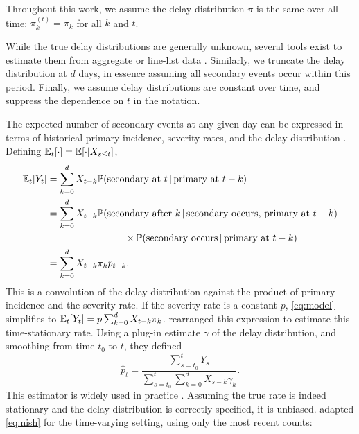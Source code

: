 \documentclass{article}
\renewcommand{\hat}{\widehat} %
\newcommand{\given}{\, \vert \,}
\begin{document}
\noindent Throughout this work, we assume the delay distribution $\pi$ is the same over all time: $\pi_k^{(t)} =
\pi_k$ for all $k$ and $t$.

While the true delay distributions are generally unknown, several
tools exist to estimate them 
from aggregate or line-list data \citep{delay_distrs}. 
Similarly,
we truncate the delay distribution at $d$ days, in essence assuming all
secondary events occur within this period. Finally, we assume delay
distributions are constant over time, and suppress the dependence on $t$ in the notation.

The expected number of secondary events at any given day can be expressed in
terms of historical primary incidence, severity rates, and the delay
distribution \citep{fusedlasso,nishiura}. Defining $\mathbb{E}_t[\cdot] = \mathbb{E}[\cdot\vert X_{s\leq t}]$,
%
\begin{align}\label{eq:model}
    \E_t[Y_t] &= \sum_{k=0}^d X_{t-k} \mathbb{P}(\text{secondary at $t$}\given\text{primary at }t-k) \nonumber \\ %
            &= \sum_{k=0}^d X_{t-k} \mathbb{P}(\text{secondary after $k$}\given\text{secondary occurs, primary at }t-k) \nonumber \\
    &\qquad\qquad\qquad\qquad\times\mathbb{P}(\text{secondary occurs}\given\text{primary at $t-k$}) \nonumber \\
    &= \sum_{k=0}^d X_{t-k} \pi_k p_{t-k}.%
\end{align}
%
This is a convolution of the delay distribution against the product of
primary incidence and the severity rate. If the severity rate is a constant
$p$, \eqref{eq:model} simplifies to $\mathbb{E}_t[Y_t] = p\sum_{k=0}^d X_{t-k}\pi_k$.
\citet{nishiura} rearranged this expression to estimate this time-stationary rate.
Using a plug-in estimate $\gamma$ of the delay distribution, and smoothing from time $t_0$ to $t$, they defined
%
\begin{equation}\label{eq:nish}
    \hat{p}_t = \frac{\sum_{s=t_0}^t Y_s}{\sum_{s=t_0}^t \sum_{k=0}^d X_{s-k}\gamma_k}.
\end{equation}
This estimator is widely used in practice \citep{nishiuraEx1, nishiuraEx2, Russell2020}. Assuming the true rate is indeed stationary and the delay distribution is correctly specified, it is unbiased. \citet{UKpaper} adapted \eqref{eq:nish} for the time-varying setting, using only the most recent counts:
\end{document}
